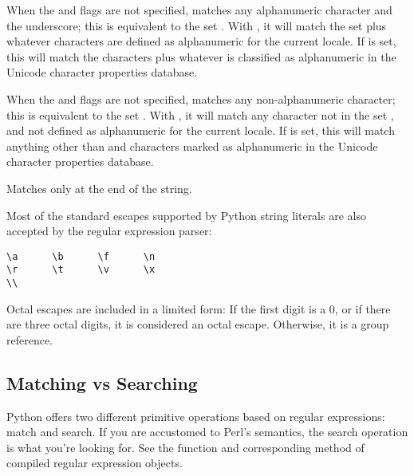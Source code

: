 \begin{list}{}{\leftmargin 0.7in }
\item[\code{\e w}]When the  and 
flags are not specified, matches any alphanumeric character and the
underscore; this is equivalent to the set
\regexp{[a-zA-Z0-9_]}.  With , it will match the set
\regexp{[0-9_]} plus whatever characters are defined as alphanumeric for
the current locale.  If  is set, this will match the
characters \regexp{[0-9_]} plus whatever is classified as alphanumeric
in the Unicode character properties database.

\item[\code{\e W}]When the  and 
flags are not specified, matches any non-alphanumeric character; this
is equivalent to the set \regexp{[{\textasciicircum}a-zA-Z0-9_]}.   With
, it will match any character not in the set
\regexp{[0-9_]}, and not defined as alphanumeric for the current locale.
If  is set, this will match anything other than
\regexp{[0-9_]} and characters marked as alphanumeric in the Unicode
character properties database.

\item[\code{\e Z}]Matches only at the end of the string.

\end{list}

Most of the standard escapes supported by Python string literals are
also accepted by the regular expression parser:

\begin{verbatim}
\a      \b      \f      \n
\r      \t      \v      \x
\\
\end{verbatim}

Octal escapes are included in a limited form: If the first digit is a
0, or if there are three octal digits, it is considered an octal
escape. Otherwise, it is a group reference.


\subsection{Matching vs Searching \label{matching-searching}}

Python offers two different primitive operations based on regular
expressions: match and search.  If you are accustomed to Perl's
semantics, the search operation is what you're looking for.  See the
 function and corresponding method of compiled
regular expression objects.


